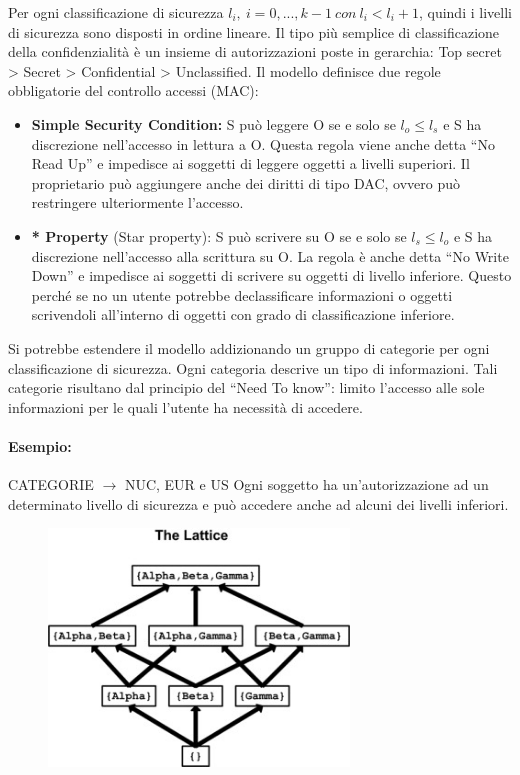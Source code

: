 Per ogni classificazione di sicurezza \(l_i, \ i=0,...,k-1 \ con \ l_i<l_i+1\), 
quindi i livelli di sicurezza sono
disposti in ordine lineare.
Il tipo più semplice di classificazione della confidenzialità è un insieme di 
autorizzazioni poste in
gerarchia: Top secret > Secret > Confidential > Unclassified.
Il modello definisce due regole obbligatorie del controllo accessi (MAC):
\begin{itemize}
      \item \textbf{Simple Security Condition:} S può leggere O se e solo se
            \(l_o \le l_s\) e S ha discrezione
            nell’accesso in lettura a O. Questa regola viene anche detta “No Read Up” 
            e impedisce ai
            soggetti di leggere oggetti a livelli superiori. Il proprietario può 
            aggiungere anche dei diritti di
            tipo DAC, ovvero può restringere ulteriormente l’accesso.
      \item \textbf{* Property} (Star property): S può scrivere su O se e solo
            se \(l_s \le l_o\) e S ha discrezione
            nell’accesso alla scrittura su O. La regola è anche detta “No Write Down” 
            e impedisce ai
            soggetti di scrivere su oggetti di livello inferiore. Questo perché se no 
            un utente potrebbe declassificare 
            informazioni o oggetti scrivendoli all'interno di oggetti con grado di 
            classificazione inferiore.
\end{itemize}

Si potrebbe estendere il modello addizionando un gruppo di categorie per ogni 
classificazione di
sicurezza. Ogni categoria descrive un tipo di informazioni.
Tali categorie risultano dal principio del “Need To know”: limito l’accesso alle
sole informazioni per
le quali l’utente ha necessità di accedere.

\paragraph{Esempio:}
CATEGORIE \(\rightarrow\) NUC, EUR e US
Ogni soggetto ha un’autorizzazione ad un determinato livello di sicurezza e può 
accedere anche
ad alcuni dei livelli inferiori.

\begin{figure}[H]
      \centering
      \includegraphics[width=8cm, keepaspectratio]{capitoli/policy/imgs/Lattuce.jpg}
\end{figure}

